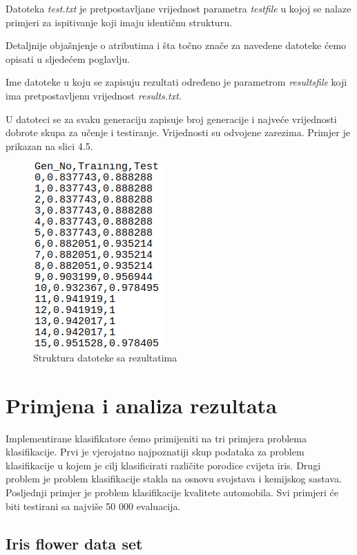 \documentclass[times, utf8, zavrsni]{fer}
\begin{document}
Datoteka \textit{test.txt} je pretpostavljane vrijednost parametra \textit{testfile} u kojoj se nalaze primjeri za ispitivanje koji imaju identičnu strukturu.

Detaljnije objašnjenje o atributima i šta točno znače za navedene datoteke ćemo opisati u sljedećem poglavlju.

Ime datoteke u koju se zapisuju rezultati određeno je parametrom \textit{resultsfile} koji ima pretpostavljenu vrijednost \textit{results.txt}.

U datoteci se za svaku generaciju zapisuje broj generacije i najveće vrijednosti dobrote skupa za učenje i testiranje. Vrijednosti su odvojene zarezima. Primjer je prikazan na slici 4.5.

\begin{figure}[htb]
\centering
\includegraphics[scale=0.5]{images/rezultati}
\caption{Struktura datoteke sa rezultatima}
\end{figure}



\chapter{Primjena i analiza rezultata}

Implementirane klasifikatore ćemo primijeniti na tri primjera problema klasifikacije. Prvi je vjerojatno najpoznatiji skup podataka za problem klasifikacije u kojem je cilj klasificirati različite porodice cvijeta iris. Drugi problem je problem klasifikacije stakla na osnovu svojstava i kemijskog sastava. Posljednji primjer je problem klasifikacije kvalitete automobila. Svi primjeri će biti testirani sa najviše 50 000 evaluacija.

\section{Iris flower data set}
\end{document}
